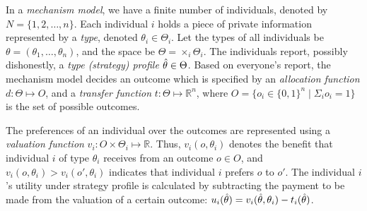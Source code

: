 In a \emph{mechanism model}, we have a finite number of individuals, denoted by $N = \{1, 2, \ldots,
n\}$.
Each individual $i$ holds a piece of private information represented by a \emph{type}, denoted
$\theta_{i} \in \Theta_i$.
Let the types of all individuals be $\theta = (\theta_1, \ldots, \theta_n)$, and the space be
$\Theta = \times_i \Theta_i$.
The individuals report, possibly dishonestly, a \emph{type (strategy) profile} $\hat{\theta} \in \Theta$.
Based on everyone's report, the mechanism model decides an outcome which is specified by an
\emph{allocation function} $d: \Theta \mapsto O$, and a \emph{transfer function} $t: \Theta \mapsto
\mathbb{R}^n$, where $O = \{o_i \in \{0,1\}^n \mid \Sigma_i o_i = 1\}$ is the set of possible
outcomes.

The preferences of an individual over the outcomes are represented using a \emph{valuation function}
$v_i: O \times \Theta_i \mapsto \mathbb{R}$.
Thus, $v_i(o, \theta_i)$ denotes the benefit that individual $i$ of type $\theta_i$ receives from an
outcome $o \in O$, and $v_i(o,\theta_i) > v_i(o',\theta_i)$ indicates that individual $i$ prefers
$o$ to $o'$.
The individual $i$'s utility under strategy profile \report is calculated by subtracting the
payment to be made from the valuation of a certain outcome: $u_i(\hat{\theta}) = v_i(\hat{\theta},
\theta_i) - t_i(\hat{\theta})$.



